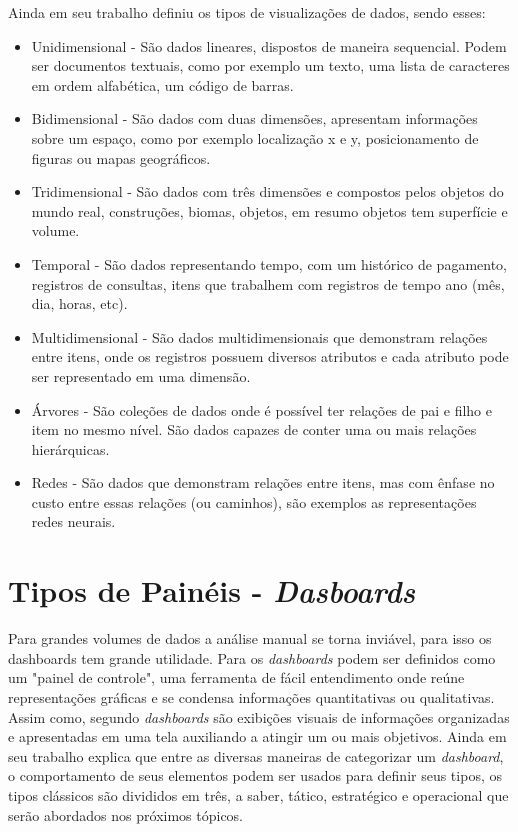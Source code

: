 \documentclass[
	12pt,				%
	openright,			%
	oneside,			%
	a4paper,			%
	english,			%
	brazil				%
	]{abntex2}
\begin{document}
 Ainda em seu trabalho \cite{Shneiderman1996} definiu os tipos de visualizações de dados, sendo esses:
\begin{itemize}
    \item Unidimensional - São dados lineares, dispostos de maneira sequencial. Podem ser documentos textuais, como por exemplo um texto, uma lista de caracteres em ordem alfabética, um código de barras.
    \item Bidimensional - São dados com duas dimensões, apresentam informações sobre um espaço, como por exemplo localização x e y, posicionamento de figuras ou mapas geográficos.
    \item Tridimensional - São dados com três dimensões e compostos pelos objetos do mundo real, construções, biomas, objetos, em resumo objetos tem superfície e volume.
    \item Temporal - São dados representando tempo, com um histórico de pagamento, registros de consultas, itens que trabalhem com registros de tempo ano (mês, dia, horas, etc).
    \item Multidimensional - São dados multidimensionais que demonstram relações entre itens, onde os registros possuem diversos atributos e cada atributo pode ser representado em uma dimensão.
    \item Árvores - São coleções de dados onde é possível ter relações de pai e filho e item no mesmo nível. São dados capazes de conter uma ou mais relações hierárquicas.
    \item Redes - São dados que demonstram relações entre itens, mas com ênfase no custo entre essas relações (ou caminhos), são exemplos as representações redes neurais.
\end{itemize}

\section{Tipos de Painéis - \textit{Dasboards}}
Para grandes volumes de dados a análise manual se torna inviável, para isso os dashboards tem grande utilidade. Para \cite{hansoti2010business} os \textit{dashboards} podem ser definidos como um "painel de controle", uma ferramenta de fácil entendimento onde reúne representações gráficas e se condensa informações quantitativas ou qualitativas. Assim como, segundo \cite{few2003information} \textit{dashboards} são exibições visuais de informações organizadas e apresentadas em uma tela auxiliando a atingir um ou mais objetivos. 
Ainda em seu trabalho \cite{few2003information} explica que entre as diversas maneiras de categorizar um \textit{dashboard}, o comportamento de seus elementos podem ser usados para definir seus tipos, os tipos clássicos são divididos em três, a saber, tático, estratégico e operacional que serão abordados nos próximos tópicos.
\end{document}
